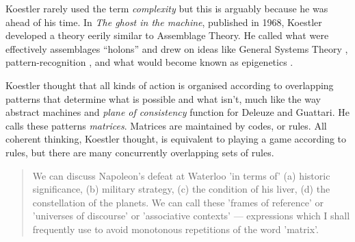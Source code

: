             Koestler rarely used the term \emph{complexity} but this is arguably because he was ahead of his time. In \emph{The ghost in the machine}, published in 1968, Koestler developed a theory eerily similar to Assemblage Theory. He called what were effectively assemblages “holons” \citep[p.48]{KoestlerGhost1968} and drew on ideas like General Systems Theory \citep[p.61]{KoestlerGhost1968}, pattern-recognition \citep[p.80]{KoestlerGhost1968}, and what would become known as epigenetics \citep[p.159]{KoestlerGhost1968}.
            
            Koestler thought that all kinds of action is organised according to overlapping patterns that determine what is possible and what isn't, much like the way abstract machines and \emph{plane of consistency} function for Deleuze and Guattari. He calls these patterns \emph{matrices}. Matrices are maintained by codes, or rules. All coherent thinking, Koestler thought, is equivalent to playing a game according to rules, but there are many concurrently overlapping sets of rules.

            \begin{quote}
                We can discuss Napoleon's defeat at Waterloo 'in terms of' (a) historic significance, (b) military strategy, (c) the condition of his liver, (d) the constellation of the planets. We can call these 'frames of reference' or 'universes of discourse' or 'associative contexts' — expressions which I shall frequently use to avoid monotonous repetitions of the word 'matrix'. \citep[p.39]{KoestlerThActOfCrtn1964}
            \end{quote}

